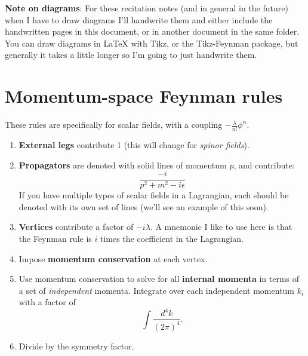 \documentclass[12pt, oneside]{article}   	%
\theoremstyle{definition}
\begin{document}



\newpage
\clearpage
\setcounter{page}{1}

\textbf{Note on diagrams}: For these recitation notes (and in general in the future) when I have to draw diagrams I'll handwrite them and either include the handwritten pages in this document, or in another document in the same folder. You can draw diagrams in LaTeX with Tikz, or the Tikz-Feynman package, but generally it takes a little longer so I'm going to just handwrite them. 

\section*{Momentum-space Feynman rules}

These rules are specifically for scalar fields, with a coupling $-\frac{\lambda}{n!}\phi^n$. 

\begin{enumerate}

	\item \textbf{External legs} contribute 1 (this will change for \textit{spinor fields}).
	
	\item \textbf{Propagators} are denoted with solid lines of momentum $p$, and contribute:
	\begin{equation}
		\frac{-i}{p^2 + m^2 - i\epsilon}
	\end{equation}
	If you have multiple types of scalar fields in a Lagrangian, each should be denoted with its own set of lines (we'll see an example of this soon). 
	
	\item \textbf{Vertices} contribute a factor of $-i\lambda$. A mnemonic I like to use here is that the Feynman rule is $i$ times the coefficient in the Lagrangian. 
	
	\item Impose \textbf{momentum conservation} at each vertex.
	
	\item Use momentum conservation to solve for all \textbf{internal momenta} in terms of a set of \textit{independent} momenta. Integrate over each independent momentum $k_i$ with a factor of
	\begin{equation}
		\int\frac{d^4k}{(2\pi)^4}.
	\end{equation}
	
	\item Divide by the symmetry factor. 

\end{enumerate}
\end{document}
